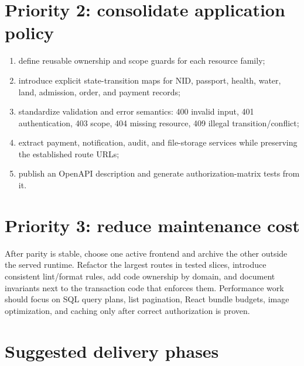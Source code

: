 \documentclass[12pt,a4paper,oneside]{report}
\begin{document}
\section{Priority 2: consolidate application policy}

\begin{enumerate}
  \item define reusable ownership and scope guards for each resource family;
  \item introduce explicit state-transition maps for NID, passport, health, water, land, admission,
        order, and payment records;
  \item standardize validation and error semantics: 400 invalid input, 401 authentication, 403
        scope, 404 missing resource, 409 illegal transition/conflict;
  \item extract payment, notification, audit, and file-storage services while preserving the
        established route URLs;
  \item publish an OpenAPI description and generate authorization-matrix tests from it.
\end{enumerate}

\section{Priority 3: reduce maintenance cost}

After parity is stable, choose one active frontend and archive the other outside the served
runtime. Refactor the largest routes in tested slices, introduce consistent lint/format rules,
add code ownership by domain, and document invariants next to the transaction code that enforces
them. Performance work should focus on SQL query plans, list pagination, React bundle budgets,
image optimization, and caching only after correct authorization is proven.

\section{Suggested delivery phases}
\end{document}
